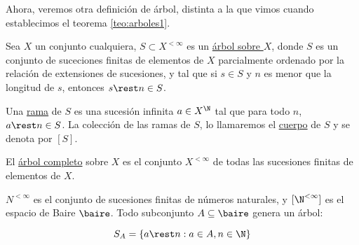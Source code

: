 Ahora, veremos otra definición de árbol, distinta a la que vimos cuando establecimos el teorema \ref{teo:arboles1}.

\begin{defn}
    Sea $X$ un conjunto cualquiera, $S \subset X^{< \infty}$ es un \ul{árbol sobre $X$}, donde $S$ es un conjunto de suceciones finitas de elementos de $X$ parcialmente ordenado por la relación de extensiones de sucesiones, y tal que si $s \in S$ y $n$ es menor que la longitud de $s$, entonces $s \rest n \in S$.
    
    Una \ul{rama} de $S$ es una sucesión infinita $a \in X^{\N}$ tal que para todo $n$, $a \rest n \in S$. La colección de las ramas de $S$, lo llamaremos el \ul{cuerpo} de $S$ y se denota por $[S]$.
    
    El \ul{árbol completo} sobre $X$ es el conjunto $X^{< \infty}$ de todas las sucesiones finitas de elementos de $X$.
\end{defn}

\begin{ejem}
    $N^{< \infty}$ es el conjunto de sucesiones finitas de números naturales, y $[\N^{< \infty}]$ es el espacio de Baire $\baire$. Todo subconjunto $A \subseteq \baire$ genera un árbol:
    
    \[
    S_A = \{ a \rest n : a \in A, n \in \N \}
    \]
\end{ejem}